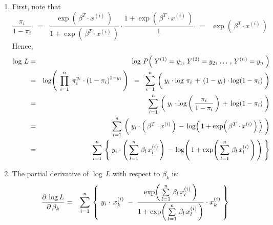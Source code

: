 \proof
\begin{enumerate}
\item
	First, note that
	\begin{equation*}
	\dfrac{\pi_{i}}{1 - \pi_{i}}
	\;\; = \;\;
		\dfrac{\exp\!\left(\,\beta^{T} \cdot x^{(i)}\,\right)}{1 + \exp\!\left(\,\beta^{T} \cdot x^{(i)}\,\right)}
		\cdot
		\dfrac{1 + \exp\!\left(\,\beta^{T} \cdot x^{(i)}\,\right)}{1}
	\;\; = \;\;
		\exp\!\left(\,\beta^{T} \cdot x^{(i)}\,\right)
	\end{equation*}
	Hence,
	\begin{eqnarray*}
	\log\,L
	&=&
		\log\,P\!\left(\;Y^{(1)} = y_{1},\,Y^{(2)} = y_{2},\,\ldots\,,\,Y^{(n)} = y_{n}\;\right)
	\\
	&=&
		\log\!\left(\;\,
			\overset{n}{\underset{i=1}{\prod}}\;\, \pi_{i}^{y_{i}} \cdot \left(1 - \pi_{i}\right)^{1-y_{i}}
			\,\right)
	\;\;=\;\;
		\overset{n}{\underset{i=1}{\sum}}\,
		\left(\;
			y_{i}\cdot\log\,\pi_{i}
			\, \overset{{\color{white}\vert}}{+} \,
			(1-y_{i})\cdot\log\!\left(1 - \pi_{i}\right)
			\;\right)	
	\\
	&=&
		\overset{n}{\underset{i=1}{\sum}}\,
		\left(\;
			y_{i}\cdot\log\left(\,\dfrac{\pi_{i}}{1 - \pi_{i}}\,\right)
			\, \overset{{\color{white}\vert}}{+} \,
			\log\!\left(1 - \pi_{i}\right)
			\;\right)	
	\\
	&=&
		\overset{n}{\underset{i=1}{\sum}}\,
		\left(\;
			y_{i}\cdot\left(\,\beta^{T} \cdot x^{(i)}\,\right)
			\, \overset{{\color{white}\vert}}{-} \,
			\log\!\left(\,1 + \exp\!\left(\,\beta^{T} \cdot x^{(i)}\,\right)\,\right)
			\;\right)	
	\\
	&=&
		\overset{n}{\underset{i=1}{\sum}}\,
		\left\{\;
			y_{i}\cdot\left(\,\overset{n}{\underset{l=1}{\sum}}\;\beta_{l}\,x^{(i)}_{l}\,\right)
			\, \overset{{\color{white}\vert}}{-} \,
			\log\!\left(\,1 + \exp\!\left(\,\overset{n}{\underset{l=1}{\sum}}\;\beta_{l}\,x^{(i)}_{l}\,\right)\,\right)
			\;\right\}	
	\end{eqnarray*}
\item
	The partial derivative of $\log\,L$ with respect to $\beta_{k}$ is:
	\begin{eqnarray*}
	\dfrac{\partial\,\log L}{\partial\,\beta_{k}}
	&=&
		\overset{n}{\underset{i=1}{\sum}}\,
		\left\{\;
			y_{i}\cdot\,x^{(i)}_{k}
			\; \overset{{\color{white}\vert}}{-} \;
			\dfrac{
				\exp\!\left(\,\overset{n}{\underset{l=1}{\sum}}\;\beta_{l}\,x^{(i)}_{l}\,\right)
				}{
				1 + \exp\!\left(\,\overset{n}{\underset{l=1}{\sum}}\;\beta_{l}\,x^{(i)}_{l}\,\right)
				}
			\cdot
			x^{(i)}_{k}
			\;\right\}	

\end{eqnarray*}
\end{enumerate}
